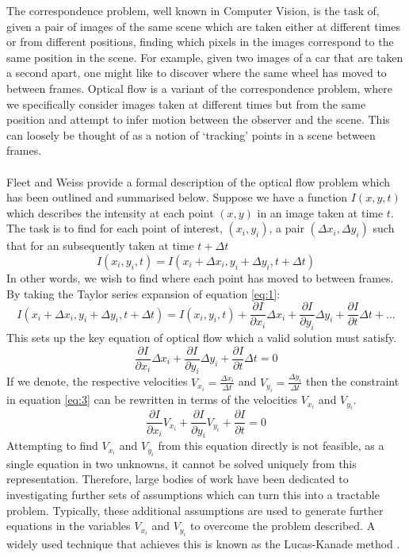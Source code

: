 The correspondence problem, well known in Computer Vision, is the task of, given a pair of images of the same scene which are taken either at different times or from different positions, finding 
which pixels in the images correspond to the same position in the scene.
For example, given two images of a car that are taken a second apart, one might like to discover where the same wheel has moved to between frames.
Optical flow is a variant of the correspondence problem, where we specifically consider images taken at different times but from the same position and attempt to infer motion between the observer 
and the scene. This can loosely be thought of as a notion of `tracking' points in a scene between frames.
\\\\
Fleet and Weiss \cite{Fleet2006} provide a formal description of the optical flow problem which has been outlined and summarised below.
Suppose we have a function $I(x,y,t)$ which describes the intensity at each point $(x,y)$ in an image taken at time $t$. 
The task is to find for each point of interest, $(x_i, y_i)$,
a pair $(\Delta x_i, \Delta y_i)$ such that for an subsequently taken at time $t + \Delta t$
\begin{equation}
 I(x_i,y_i,t) = I(x_i + \Delta x_i, y_i + \Delta y_i, t+\Delta t)
 \label{eq:1}
\end{equation}
In other words, we wish to find where each point has moved to between frames.
By taking the Taylor series expansion of equation \ref{eq:1}: 
\begin{equation}
I(x_i + \Delta x_i, y_i + \Delta y_i, t+\Delta t) = I(x_i,y_i,t) + \frac{\partial I}{\partial x_i}\Delta x_i + \frac{\partial I}{\partial y_i} \Delta y_i + \frac{\partial I}{\partial t} \Delta t + ... 
\label{eq:2}
\end{equation}
This sets up the key equation of optical flow which a valid solution must satisfy. 
\begin{equation*}
    \frac{\partial I}{\partial x_i}\Delta x_i + \frac{\partial I}{\partial y_i} \Delta y_i + \frac{\partial I}{\partial t} \Delta t  = 0
    \label{eq:3}
\end{equation*}
If we denote, the respective velocities $V_{x_i} = \frac{\Delta x_i}{\Delta t}$ and $V_{y_i} = \frac{\Delta y_i}{\Delta t}$ then the constraint in equation \ref{eq:3} 
can be rewritten in terms of the velocities $V_{x_i}$ and $V_{y_i}$.
\begin{equation*}
    \frac{\partial I}{\partial x_i}V_{x_i} + \frac{\partial I}{\partial y_i}  V_{y_i} + \frac{\partial I}{\partial t}  = 0
\end{equation*}
Attempting to find $V_{x_i}$ and $V_{y_i}$ from this equation directly is not feasible, as a single equation in two unknowns, it cannot be solved uniquely from this representation.
Therefore, large bodies of work have been dedicated to investigating further sets of assumptions which can turn this into a tractable problem.
Typically, these additional assumptions are used to generate further equations in the variables $V_{x_i}$ and $V_{y_i}$ to overcome the problem described. A widely used technique that achieves this is
known as the Lucas-Kanade method \cite{LucasKanade}.

